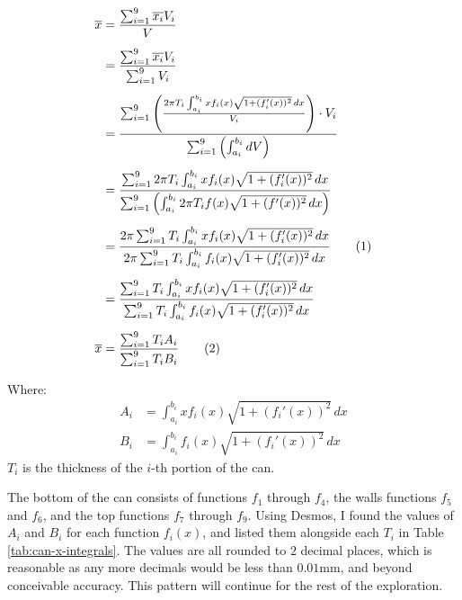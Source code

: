 \documentclass[11pt]{article}
\newcommand{\numberthis}{\addtocounter{equation}{1}\tag{\theequation}}
\begin{document}
    \begin{minipage}{.55\textwidth}
        \footnotesize
        \begin{align*}
            \overline{x} &= \frac{\sum_{i=1}^9 \overline{x_i} V_i}{V} \\[5pt]
            &= \frac{\sum_{i=1}^9 \overline{x_i} V_i}{\sum_{i=1}^9 V_i} \\[5pt]
            &= \frac{\sum_{i=1}^9 \left( \frac{2 \pi T_i \int_{a_i}^{b_i} x f_i(x) \sqrt{1 + (f_i'(x))^2} \, dx}{V_i} \right) \cdot V_i}{\sum_{i=1}^9 \left( \int_{a_i}^{b_i} dV \right)} \\[5pt]
            &= \frac{\sum_{i=1}^9 2 \pi T_i \int_{a_i}^{b_i} x f_i(x) \sqrt{1 + (f_i'(x))^2} \, dx}{\sum_{i=1}^9 \left( \int_{a_i}^{b_i} 2 \pi T_i f(x) \sqrt{1 + (f'(x))^2} \, dx \right)} \\[5pt]
            &= \frac{2 \pi \sum_{i=1}^9 T_i \int_{a_i}^{b_i} x f_i(x) \sqrt{1 + (f_i'(x))^2} \, dx}{2 \pi \sum_{i=1}^9 T_i \int_{a_i}^{b_i} f_i(x) \sqrt{1 + (f_i'(x))^2} \, dx} \numberthis{\label{eq:can-x-frac}} \\[5pt]
            &= \frac{\sum_{i=1}^9 T_i \int_{a_i}^{b_i} x f_i(x) \sqrt{1 + (f_i'(x))^2} \, dx}{\sum_{i=1}^9 T_i \int_{a_i}^{b_i} f_i(x) \sqrt{1 + (f_i'(x))^2} \, dx} \\[5pt]
            \overline{x} &= \frac{\sum_{i=1}^9 T_i A_i}{\sum_{i=1}^9 T_i B_i} \numberthis{\label{eq:can-x-cm}}
        \end{align*}
    \end{minipage}%
    \begin{minipage}{.45\textwidth}
        \footnotesize
        \centering
        \vspace{170pt}
        Where:
        \begin{align*}
            A_i &= \int_{a_i}^{b_i} x f_i(x) \sqrt{1 + (f_i'(x))^2} \, dx \\[5pt]
            B_i &= \int_{a_i}^{b_i} f_i(x) \sqrt{1 + (f_i'(x))^2} \, dx
        \end{align*}
        $T_i$ is the thickness of the $i$-th portion of the can.
    \end{minipage}
    \vspace{4pt}

    The bottom of the can consists of functions $f_1$ through $f_4$, the walls functions $f_5$ and $f_6$, and the top functions $f_7$ through $f_9$. Using Desmos, I found the values of $A_i$ and $B_i$ for each function $f_i(x)$, and listed them alongside each $T_i$ in Table \ref{tab:can-x-integrals}. The values are all rounded to $2$ decimal places, which is reasonable as any more decimals would be less than $0.01 \mathrm{mm}$, and beyond conceivable accuracy. This pattern will continue for the rest of the exploration.
\end{document}
